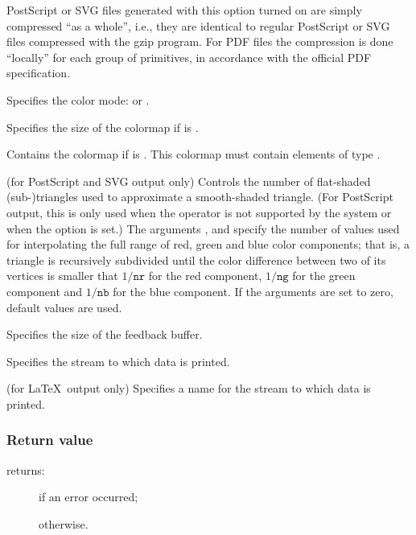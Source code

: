 \begin{description}
\begin{description}
  PostScript or SVG files generated with this option turned on are
  simply compressed ``as a whole'', i.e., they are identical to
  regular PostScript or SVG files compressed with the gzip
  program. For PDF files the compression is done ``locally'' for each
  group of primitives, in accordance with the official PDF
  specification.
\end{description}

\item[\dd{colormode}] Specifies the color mode:  or
  .
\item[\dd{colorsize}] Specifies the size of the colormap if 
  is .
\item[\dd{colortable}] Contains the colormap if  is
  . This colormap must contain  elements of
  type .
\item[\dd{nr}, \dd{ng}, \dd{nb}] (for PostScript and SVG output only)
  Controls the number of flat-shaded \mbox{(sub-)triangles} used to
  approximate a smooth-shaded triangle. (For PostScript output, this
  is only used when the  operator is not supported by the
  system or when the  option is set.)  The
  arguments ,  and  specify the number of values
  used for interpolating the full range of red, green and blue color
  components; that is, a triangle is recursively subdivided until the
  color difference between two of its vertices is smaller that
  $1/\mathtt{nr}$ for the red component, $1/\mathtt{ng}$ for the green
  component and $1/\mathtt{nb}$ for the blue component. If the
  arguments are set to zero, default values are used.
\item[\dd{buffersize}] Specifies the size of the feedback buffer.
\item[\dd{stream}] Specifies the stream to which data is printed.
\item[\dd{filename}] (for \LaTeX\ output only) Specifies a name for
  the stream to which data is printed.
\end{description}

\subsubsection{Return value}

\noindent{} returns:
\begin{description}
\item[] if an error occurred;
\item[] otherwise.
\end{description}

